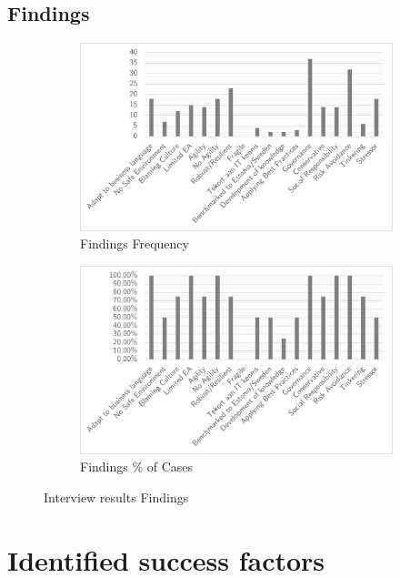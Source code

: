 \subsection{Findings}
\begin{figure}[H]
	\centering
	\begin{subfigure}[H]{0.5\textwidth}
		\centering
		\includegraphics[width=0.95\linewidth]{images/findings_frequency}
		\caption{Findings Frequency}
		\label{fig:findingsfrequency}
	\end{subfigure}%
	\begin{subfigure}[H]{0.5\textwidth}
		\centering
		\includegraphics[width=0.95\linewidth]{images/findings_cases}
		\caption{Findings \% of Cases}
		\label{fig:findingscases}
	\end{subfigure}
	\caption{Interview results Findings}
	\label{fig:interviewresultsfindings}
\end{figure}


\section{Identified success factors}

